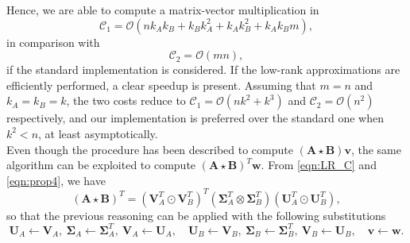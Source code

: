 \documentclass[10pt,titlepage]{article}
\numberwithin{equation}{section}
\numberwithin{figure}{section}
\newcommand{\hadamard}[2]{\mathbf{#1} \star \mathbf{#2}}
\begin{document}
Hence, we are able to compute a matrix-vector multiplication in
\begin{equation}
	\mathcal{C}_1=\mathcal{O}(n k_A k_B + k_Bk_A^2+k_Ak_B^2 + k_A k_B m), 
\end{equation}
in comparison with
\begin{equation}
	\mathcal{C}_2=\mathcal{O}(mn),
\end{equation}
if the standard implementation is considered. If the low-rank approximations are efficiently performed, a clear speedup is present. Assuming that $m=n$ and $k_A=k_B=k$, the two costs reduce to $\mathcal{C}_1=\mathcal{O}(nk^2+k^3)$ and $\mathcal{C}_2=\mathcal{O}(n^2)$ respectively, and our implementation is preferred over the standard one when $k^2<n$, at least asymptotically. \\
Even though the procedure has been described to compute $(\hadamard{A}{B}) \mathbf{v}$, the same algorithm can be exploited to compute $(\hadamard{A}{B})^T \mathbf{w}$. From \eqref{eqn:LR_C} and \eqref{eqn:prop4}, we have 
\begin{equation}
(\hadamard{A}{B})^T=
\left( \mathbf{V}_A^T \odot \mathbf{V}_B^T \right)^T
\left( \mathbf{\Sigma}_A^T \otimes \mathbf{\Sigma}_B^T \right)
\left( \mathbf{U}_A^T \odot \mathbf{U}_B^T \right),
\label{eqn:LR_Ct}
\end{equation}
so that the previous reasoning can be applied with the following substitutions
\begin{equation}
	\mathbf{U}_A \leftarrow \mathbf{V}_A, \ \mathbf{\Sigma}_A \leftarrow \mathbf{\Sigma}_A^T, \ \mathbf{V}_A \leftarrow \mathbf{U}_A, \quad	\mathbf{U}_B \leftarrow \mathbf{V}_B, \ \mathbf{\Sigma}_B \leftarrow \mathbf{\Sigma}_B^T, \ \mathbf{V}_B \leftarrow \mathbf{U}_B, \quad \mathbf{v} \leftarrow \mathbf{w}.
\end{equation}
\end{document}
